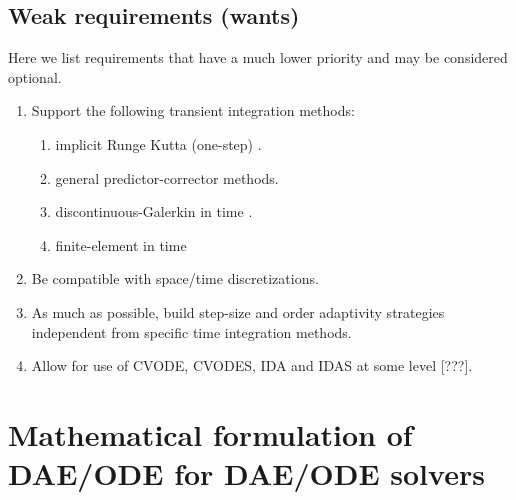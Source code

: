 \documentclass[pdf,ps2pdf,11pt]{SANDreport}
\begin{document}
\subsection{Weak requirements (wants)}

Here we list requirements that have a much lower priority and may be
considered optional.

\begin{enumerate}

{}\item Support the following transient integration methods:
  \begin{enumerate}
  {}\item implicit Runge Kutta (one-step) \cite{IRKMethods}.
  {}\item general predictor-corrector methods.
  {}\item discontinuous-Galerkin in time \cite{DGTime}.
  {}\item finite-element in time \cite{FETime}
  \end{enumerate}

{}\item Be compatible with space/time discretizations.

{}\item As much as possible, build step-size and order adaptivity strategies
independent from specific time integration methods.

{}\item Allow for use of CVODE, CVODES, IDA and IDAS at some level [???].

\end{enumerate}

\section{Mathematical formulation of DAE/ODE for DAE/ODE solvers}
\label{rythmos:scn:mathformulation}
\end{document}
